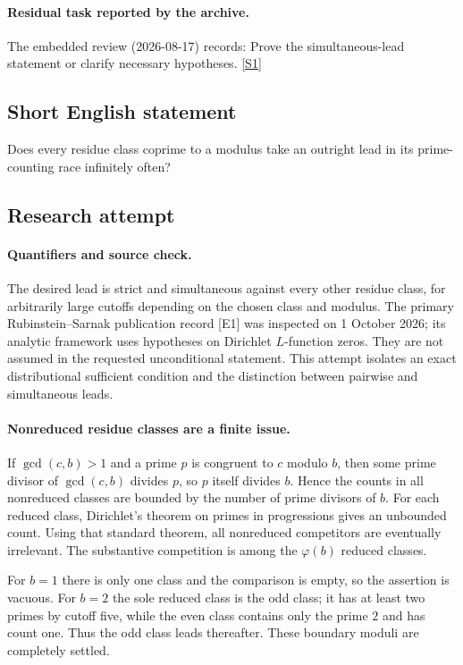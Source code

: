 \documentclass[11pt,a4paper]{article}
\newcommand{\sref}[2]{\hyperlink{source:#1:#2}{[S#2]}}
\begin{document}
\paragraph{Residual task reported by the archive.}

The embedded review (2026-08-17) records: Prove the simultaneous-lead statement or clarify necessary hypotheses. \sref{1855}{1}

\subsection{Short English statement}

Does every residue class coprime to a modulus take an outright lead in its prime-counting race infinitely often?

\subsection{Research attempt}

\paragraph{Quantifiers and source check.}
The desired lead is strict and simultaneous against every other residue
class, for arbitrarily large cutoffs depending on the chosen class and
modulus. The primary Rubinstein--Sarnak publication record [E1] was
inspected on 1 October 2026; its analytic framework uses hypotheses
on Dirichlet $L$-function zeros. They are not assumed in the requested
unconditional statement. This attempt isolates an exact distributional
sufficient condition and the distinction between pairwise and simultaneous
leads.

\paragraph{Nonreduced residue classes are a finite issue.}
If $\gcd(c,b)>1$ and a prime $p$ is congruent to $c$ modulo $b$,
then some prime divisor of $\gcd(c,b)$ divides $p$, so $p$ itself
divides $b$. Hence the counts in all nonreduced classes are bounded
by the number of prime divisors of $b$. For each reduced class,
Dirichlet's theorem on primes in progressions gives an unbounded count.
Using that standard theorem, all nonreduced competitors are eventually
irrelevant. The substantive competition is among the $\varphi(b)$
reduced classes.

For $b=1$ there is only one class and the comparison is empty, so the
assertion is vacuous. For $b=2$ the sole reduced class is the odd class;
it has at least two primes by cutoff five, while the even class contains
only the prime $2$ and has count one. Thus the odd class leads thereafter.
These boundary moduli are completely settled.
\end{document}
